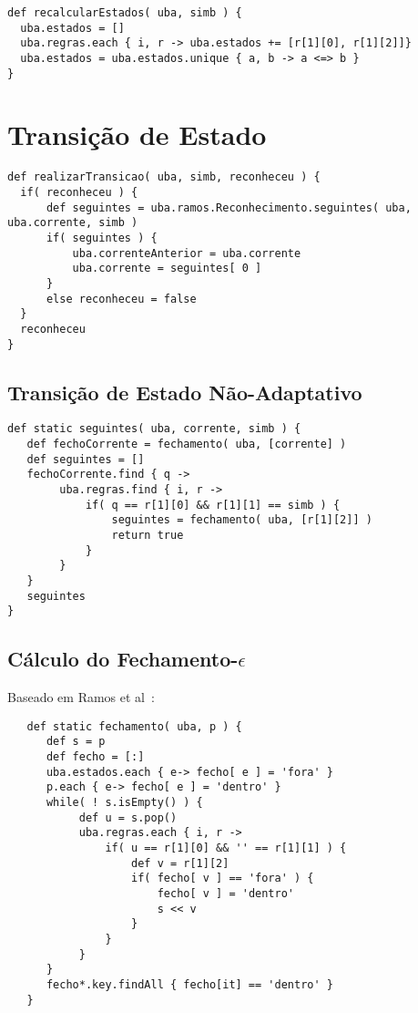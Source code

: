 \begin{lstlisting}
def recalcularEstados( uba, simb ) {
  uba.estados = []
  uba.regras.each { i, r -> uba.estados += [r[1][0], r[1][2]]}
  uba.estados = uba.estados.unique { a, b -> a <=> b }
}
\end{lstlisting}

\section{Transição de Estado}
\label{sec:isv:execucao-transicao}

\begin{lstlisting}
def realizarTransicao( uba, simb, reconheceu ) {
  if( reconheceu ) {
      def seguintes = uba.ramos.Reconhecimento.seguintes( uba, uba.corrente, simb )
      if( seguintes ) {
          uba.correnteAnterior = uba.corrente
          uba.corrente = seguintes[ 0 ]
      }
      else reconheceu = false
  }
  reconheceu
}
\end{lstlisting}

\subsection{Transição de Estado Não-Adaptativo}

\begin{lstlisting}
def static seguintes( uba, corrente, simb ) {
   def fechoCorrente = fechamento( uba, [corrente] )
   def seguintes = []
   fechoCorrente.find { q ->
        uba.regras.find { i, r ->
            if( q == r[1][0] && r[1][1] == simb ) {
                seguintes = fechamento( uba, [r[1][2]] )
                return true
            }
        }
   }
   seguintes
}
\end{lstlisting}

\subsection{Cálculo do Fechamento-$\epsilon$}

Baseado em Ramos et al~\cite{ramos:2009:lftmi}:

\begin{lstlisting}
   def static fechamento( uba, p ) {
      def s = p
      def fecho = [:]
      uba.estados.each { e-> fecho[ e ] = 'fora' }
      p.each { e-> fecho[ e ] = 'dentro' }
      while( ! s.isEmpty() ) {
           def u = s.pop()
           uba.regras.each { i, r ->
               if( u == r[1][0] && '' == r[1][1] ) {
                   def v = r[1][2]
                   if( fecho[ v ] == 'fora' ) {
                       fecho[ v ] = 'dentro'
                       s << v
                   }
               }
           }
      }
      fecho*.key.findAll { fecho[it] == 'dentro' }
   }
\end{lstlisting}



